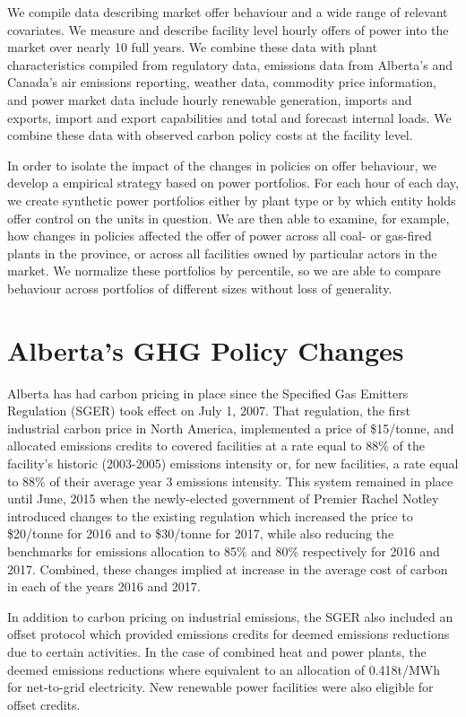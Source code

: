 \documentclass[12pt]{article}
\begin{document}
We compile data describing market offer behaviour and a wide range of relevant covariates.  We measure and describe facility level hourly offers of power into the market over nearly 10 full years.  We combine these data with plant characteristics compiled from regulatory data, emissions data from Alberta's and Canada's air emissions reporting, weather data, commodity price information, and power market data include hourly renewable generation, imports and exports, import and export capabilities and total and forecast internal loads.  We combine these data with observed carbon policy costs at the facility level.

In order to isolate the impact of the changes in policies on offer behaviour, we develop a empirical strategy based on power portfolios.  For each hour of each day, we create synthetic power portfolios either by plant type or by which entity holds offer control on the units in question.  We are then able to examine, for example, how changes in policies affected the offer of power across all coal- or gas-fired plants in the province, or across all facilities owned by particular actors in the market.  We normalize these portfolios by percentile, so we are able to compare behaviour across portfolios of different sizes without loss of generality.

\section{Alberta's GHG Policy Changes}

Alberta has had carbon pricing in place since the Specified Gas Emitters Regulation (SGER) took effect on July 1, 2007. That regulation, the first industrial carbon price in North America, implemented a price of \$15/tonne, and allocated emissions credits to covered facilities at a rate equal to 88\% of the facility's historic (2003-2005) emissions intensity or, for new facilities, a rate equal to 88\% of their average year 3 emissions intensity. This system remained in place until June, 2015 when the newly-elected government of Premier Rachel Notley introduced changes to the existing regulation which increased the price to \$20/tonne for 2016 and to \$30/tonne for 2017, while also reducing the benchmarks for emissions allocation to 85\% and 80\% respectively for 2016 and 2017.  Combined, these changes implied at increase in the average cost of carbon in each of the years 2016 and 2017.

In addition to carbon pricing on industrial emissions, the SGER also included an offset protocol which provided emissions credits for deemed emissions reductions due to certain activities.  In the case of combined heat and power plants, the deemed emissions reductions where equivalent to an allocation of 0.418t/MWh for net-to-grid electricity.  New renewable power facilities were also eligible for offset credits.
\end{document}
